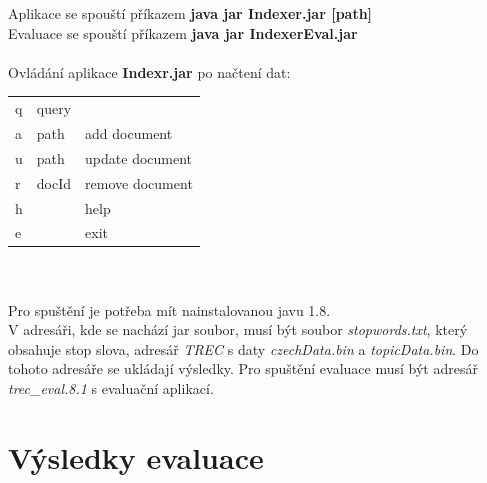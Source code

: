 Aplikace se spouští příkazem \textbf{java jar Indexer.jar [path]}\\
Evaluace se spouští příkazem \textbf{java jar IndexerEval.jar}
\\
\\
Ovládání aplikace  \textbf{Indexr.jar} po načtení dat:\\
\begin{tabular}{ l l l }
q & query\\
a & path & add document\\
u &  path & update document\\
r & docId & remove document\\
h && help\\
e && exit
\end{tabular}
\\
\\
Pro spuštění je potřeba mít nainstalovanou javu 1.8.\\
V adresáři, kde se nachází jar soubor, musí být soubor \emph{stopwords.txt}, který obsahuje stop slova, adresář \emph{TREC} s daty \emph{czechData.bin} a \emph{topicData.bin}. Do tohoto adresáře se ukládají výsledky. Pro spuštění evaluace musí být adresář \emph{trec\_eval.8.1} s evaluační aplikací.



\chapter{Výsledky evaluace}

